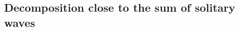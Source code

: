 \documentclass[reqno]{amsart}
\theoremstyle{plain}
\theoremstyle{definition}
\numberwithin{equation}{section}
\renewcommand{\r}{\right}
\newcommand{\1}{\mathbbm{1}}
\begin{document}




\subsection{Decomposition close to the sum of solitary waves}
\end{document}
